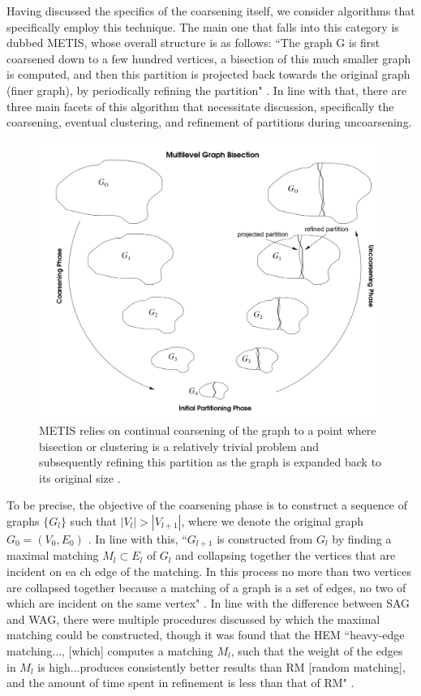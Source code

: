 \documentclass{article}
\begin{document}
Having discussed the specifics of the coarsening itself, we consider algorithms that specifically employ this technique. The main one that falls into this category is dubbed METIS, whose overall structure is as follows: ``The graph G is first coarsened down to a few hundred vertices, a bisection of this much smaller graph is computed, and then this partition is projected back towards the original graph (finer graph), by periodically refining the partition" \cite{metis}. In line with that, there are three main facets of this algorithm that necessitate discussion, specifically the coarsening, eventual clustering, and refinement of partitions during uncoarsening.

\begin{figure}
    \label{fig:metis}
    \centering
    \includegraphics[width=.75\textwidth]{metis.png}
    \caption[METIS Architecture]{METIS relies on continual coarsening of the graph to a point where bisection or clustering is a relatively trivial problem and subsequently refining this partition as the graph is expanded back to its original size \cite{metis}.}
\end{figure}

To be precise, the objective of the coarsening phase is to construct a sequence of graphs $\{G_{l}\}$ such that $|V_{l}| > |V_{l+1}|$, where we denote the original graph $G_{0}=(V_0,E_0)$ \cite{metis}. In line with this, ``$G_{l+1}$ is constructed from $G_l$ by finding a maximal matching $M_l\subset E_l$ of $G_l$ and collapsing together the vertices that are incident on ea ch edge of the matching. In this process no more than two vertices are collapsed together because a matching of a graph is a set of edges, no two of which are incident on the same vertex" \cite{metis}. In line with the difference between SAG and WAG, there were multiple procedures discussed by which the maximal matching could be constructed, though it was found that the HEM ``heavy-edge matching..., [which] computes a matching $M_l$, such that the weight of the edges in $M_l$ is high...produces consistently better results than RM [random matching], and the amount of time spent in refinement is less than that of RM" \cite{metis}.
\end{document}
